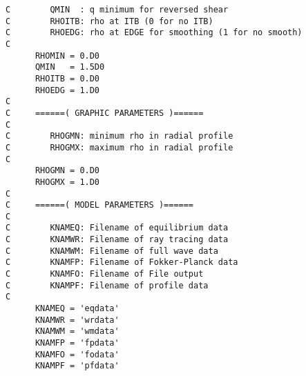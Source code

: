 \documentclass[11pt]{jarticle}
\begin{document}
\begin{verbatim}
C        QMIN  : q minimum for reversed shear
C        RHOITB: rho at ITB (0 for no ITB)
C        RHOEDG: rho at EDGE for smoothing (1 for no smooth)
C
      RHOMIN = 0.D0
      QMIN   = 1.5D0
      RHOITB = 0.D0
      RHOEDG = 1.D0
C
C     ======( GRAPHIC PARAMETERS )======
C
C        RHOGMN: minimum rho in radial profile
C        RHOGMX: maximum rho in radial profile
C
      RHOGMN = 0.D0
      RHOGMX = 1.D0
C
C     ======( MODEL PARAMETERS )======
C
C        KNAMEQ: Filename of equilibrium data
C        KNAMWR: Filename of ray tracing data
C        KNAMWM: Filename of full wave data
C        KNAMFP: Filename of Fokker-Planck data
C        KNAMFO: Filename of File output
C        KNAMPF: Filename of profile data
C
      KNAMEQ = 'eqdata'
      KNAMWR = 'wrdata'
      KNAMWM = 'wmdata'
      KNAMFP = 'fpdata'
      KNAMFO = 'fodata'
      KNAMPF = 'pfdata'
\end{verbatim}
\end{document}
